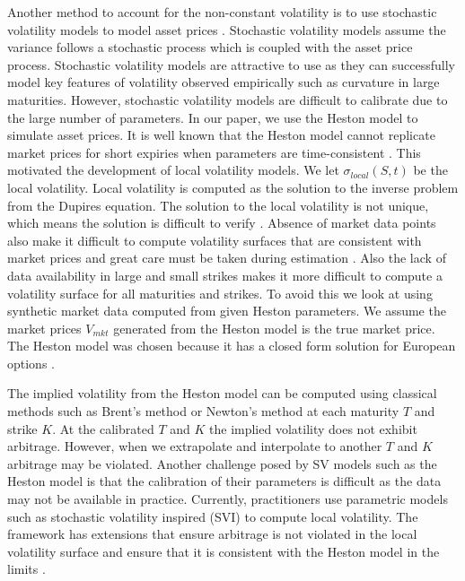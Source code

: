 \documentclass{article}
\theoremstyle{plain}%
\theoremstyle{definition}
\theoremstyle{remark}
\begin{document}
Another method to account for the non-constant volatility is to use stochastic volatility models to model asset prices \citep{lee-2002}. Stochastic volatility models assume the variance follows a stochastic process which is coupled with the asset price process. Stochastic volatility models are attractive to use as they can successfully model key features of volatility observed empirically such as curvature in large maturities. However, stochastic volatility models are difficult to calibrate due to the large number of parameters. In our paper, we use the Heston model to simulate asset prices. It is well known that the Heston model cannot replicate market prices for short expiries when parameters are time-consistent \citep{gatheral-2001-2}. This motivated the development of local volatility models. We let $\sigma_{local}(S,t)$ be the local volatility. Local volatility is computed as the solution to the inverse problem from the Dupires equation. The solution to the local volatility is not unique, which means the solution is difficult to verify \citep{gatheral-2001-1}. Absence of market data points also make it difficult to compute volatility surfaces that are consistent with market prices and great care must be taken during estimation \citep{coleman-2000, boyle-2000}. Also the lack of data availability in large and small strikes makes it more difficult to compute a volatility surface for all maturities and strikes. To avoid this we look at using synthetic market data computed from given Heston parameters. We assume the market prices $V_{mkt}$ generated from the Heston model is the true market price. The Heston model was chosen because it has a closed form solution for European options \citep{heston-1993}. 

The implied volatility from the Heston model can be computed using classical methods such as Brent's method or Newton's method at each maturity $T$ and strike $K$. At the calibrated $T$ and $K$ the implied volatility does not exhibit arbitrage. However, when we extrapolate and interpolate to another $T$ and $K$ arbitrage may be violated. Another challenge posed by SV models such as the Heston model is that the calibration of their parameters is difficult as the data may not be available in practice. Currently, practitioners use parametric models such as stochastic volatility inspired (SVI) to compute local volatility. The framework has extensions that ensure arbitrage is not violated in the local volatility surface and ensure that it is consistent with the Heston model in the limits \citep{gatheral-2011,gatheral-2014}.
\end{document}
